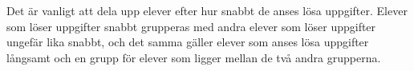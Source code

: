 \textcolor{turkos} {Det är vanligt att dela upp elever efter hur snabbt de anses lösa uppgifter. Elever som löser uppgifter snabbt grupperas med andra elever som löser uppgifter ungefär lika snabbt, och det samma gäller elever som anses lösa uppgifter långsamt och en grupp för elever som ligger mellan de två andra grupperna. \cite{Skolverket03}}